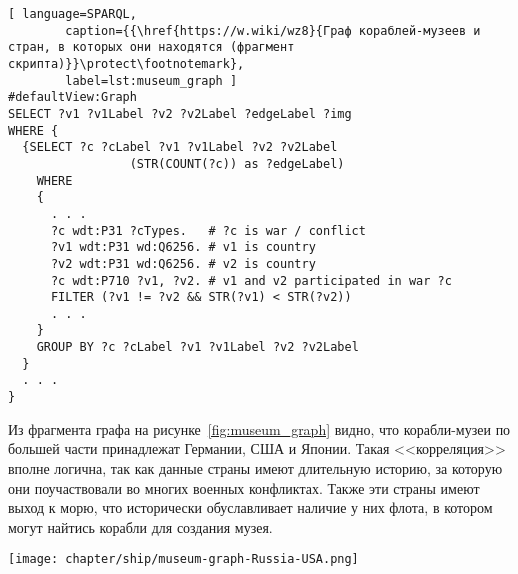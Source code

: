 \begin{lstlisting}[ language=SPARQL, 
        caption={{\href{https://w.wiki/wz8}{Граф кораблей-музеев и стран, в которых они находятся (фрагмент скрипта)}}\protect\footnotemark}, 
        label=lst:museum_graph ]
#defaultView:Graph
SELECT ?v1 ?v1Label ?v2 ?v2Label ?edgeLabel ?img
WHERE {
  {SELECT ?c ?cLabel ?v1 ?v1Label ?v2 ?v2Label 
                 (STR(COUNT(?c)) as ?edgeLabel) 
    WHERE
    {
      . . .
      ?c wdt:P31 ?cTypes.   # ?c is war / conflict
      ?v1 wdt:P31 wd:Q6256. # v1 is country
      ?v2 wdt:P31 wd:Q6256. # v2 is country
      ?c wdt:P710 ?v1, ?v2. # v1 and v2 participated in war ?c
      FILTER (?v1 != ?v2 && STR(?v1) < STR(?v2)) 
      . . .
    }
    GROUP BY ?c ?cLabel ?v1 ?v1Label ?v2 ?v2Label
  }
  . . .
}
\end{lstlisting}

Из фрагмента графа на рисунке~\ref{fig:museum_graph} видно, 
что корабли-музеи по большей части принадлежат Германии, США и Японии. 
Такая <<корреляция>> вполне логична, так как данные страны имеют длительную историю, 
за которую они поучаствовали во многих военных конфликтах. 
Также эти страны имеют выход к морю, что исторически обуславливает наличие у них флота, 
в котором могут найтись корабли для создания музея.

\begin{figure*}[h]
  \texttt{[image: chapter/ship/museum-graph-Russia-USA.png]}
  \caption[Граф стран и кораблей-музеев, 2021 год.]{Фрагмент графа стран, участвовавших в войнах. Фрагмент включает ряд кораблей-музеев России и США. Граф построен по скрипту~\protect\ref{lst:museum_graph} в 2021 году.}%
  \label{fig:museum_graph}%
\end{figure*}

